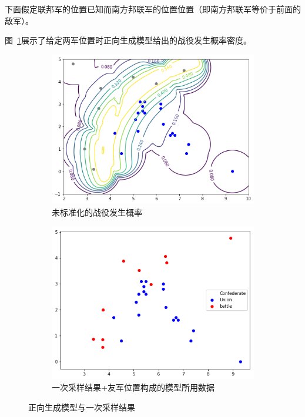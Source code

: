\documentclass{sicnuthesis}
\begin{document}
下面假定联邦军的位置已知而南方邦联军的位置位置（即南方邦联军等价于前面的敌军）。

图~\ref{fig:gettysburgTwo}展示了给定两军位置时正向生成模型给出的战役发生概率密度。

\begin{figure}[htb]
  \begin{subfigure}[b]{0.49\linewidth}
    \includegraphics[width=\linewidth]{gettysburg-forward.png}
    \caption{未标准化的战役发生概率}
  \end{subfigure}
  \begin{subfigure}[b]{0.49\linewidth}
    \includegraphics[width=\linewidth]{gettysburg-sample.png}
    \caption{一次采样结果+友军位置构成的模型所用数据}
  \end{subfigure}
  \caption{正向生成模型与一次采样结果}
  \label{fig:gettysburgTwo}
\end{figure}
\end{document}
